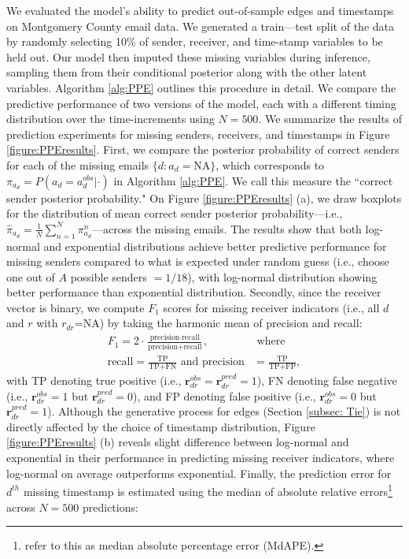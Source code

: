 \documentclass[ba]{imsart}
\numberwithin{equation}{section}
\theoremstyle{plain}
\begin{document}
	We evaluated the model’s ability to predict out-of-sample edges and timestamps on Montgomery County email data. We generated a train—test split of the data by randomly selecting 10\% of sender, receiver, and time-stamp variables to be held out.  Our model then imputed these missing variables during inference, sampling them from their conditional posterior along with the other latent variables. Algorithm \ref{alg:PPE} outlines this procedure in detail. We compare the predictive performance of two versions of the model, each with a different timing distribution over the time-increments using $N=500$. We summarize the results of prediction experiments for missing senders, receivers, and timestamps in Figure \ref{figure:PPEresults}. First, we compare the posterior probability of correct senders for each of the missing emails $\{d:a_d=\mbox{NA}\}$, which corresponds to $\pi_{a_{d}}=P(a_{d} = a^{obs}_{d}|\cdot)$ in Algorithm \ref{alg:PPE}. We call this measure the ``correct sender posterior probability." On Figure \ref{figure:PPEresults} (a), we draw boxplots for the distribution of mean correct sender posterior probability---i.e., $\hat{\pi}_{a_{d}} = \frac{1}{N}\sum_{n=1}^N \pi^n_{a_{d}}$---across the missing emails. The results show that both log-normal and exponential distributions achieve better predictive performance for missing senders compared to what is expected under random guess (i.e., choose one out of $A$ possible senders $=1/18$), with log-normal distribution showing better performance than exponential distribution. Secondly, since the receiver vector is binary, we compute $F_1$ scores for missing receiver indicators (i.e., all $d$ and $r$ with $r_{dr}$=NA) by taking the harmonic mean of precision and recall:
	\begin{equation}
		\begin{aligned}
			F_1 =2\cdot\frac{\mbox{precision}\cdot \mbox{recall}}{\mbox{precision}+ \mbox{recall}}, &\mbox{ where } \\
			\mbox{recall}  = \frac{\mbox{TP}}{\mbox{TP+FN}} \mbox{ and } \mbox{precision} & =\frac{\mbox{TP}}{\mbox{TP+FP}},
		\end{aligned}
	\end{equation}
	with TP denoting true positive (i.e., $\boldsymbol{r}^{obs}_{dr}=\boldsymbol{r}^{pred}_{dr}=1$), FN denoting false negative (i.e., $\boldsymbol{r}^{obs}_{dr}=1$ but $\boldsymbol{r}^{pred}_{dr}=0$), and FP denoting false positive (i.e., $\boldsymbol{r}^{obs}_{dr}=0$ but $\boldsymbol{r}^{pred}_{dr}=1$). Although the generative process for edges (Section \ref{subsec: Tie}) is not directly affected by the choice of timestamp distribution, Figure \ref{figure:PPEresults} (b) reveals slight difference between log-normal and exponential in their performance in predicting missing receiver indicators, where log-normal on average outperforms exponential. Finally, the prediction error for $d^{th}$ missing timestamp is estimated using the median of absolute relative errors\footnote{\cite{hyndman2006another} refer to this as median absolute percentage error (MdAPE).} across $N=500$ predictions:
\end{document}
